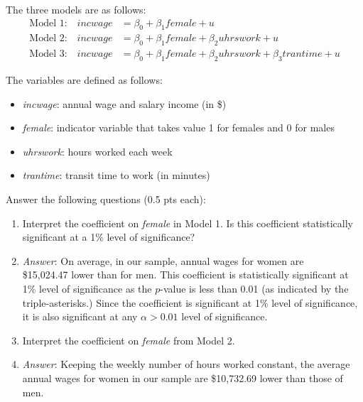 \documentclass{./../../Latex/handout}
\begin{document}
\begin{enumerate}
The three models are as follows: 
\begin{align*}
	 \text{Model 1:} \quad incwage &=\beta_0 + \beta_1  female + u \\
	 \text{Model 2:} \quad incwage &=\beta_0 + \beta_1  female + \beta_2 uhrswork + u \\
	 \text{Model 3:} \quad incwage &=\beta_0 + \beta_1  female + \beta_2 uhrswork + \beta_3 trantime + u 
\end{align*}

The variables are defined as follows:
\begin{itemize}
  \item \textit{incwage}: annual wage and salary income (in \$)
  \item \textit{female}: indicator variable that takes value 1 for females and 0 for males
  \item \textit{uhrswork}: hours worked each week
  \item \textit{trantime}: transit time to work (in minutes) \\
\end{itemize}

Answer the following questions (0.5 pts each):
\begin{enumerate}
  \item Interpret the coefficient on \textit{female} in Model 1. Is this coefficient statistically significant at a 1\% level of significance?
  \item[] \textit{Answer}: On average, in our sample, annual wages for women are \\ \$15,024.47 lower than for men. This coefficient is statistically significant at 1\% level of significance as the $p$-value is less than 0.01 (as indicated by the triple-asterisks.) Since the coefficient is significant at 1\% level of significance, it is also significant at any $\alpha>0.01$ level of significance. \\
  
  \item Interpret the coefficient on \textit{female} from Model 2.
  \item[] \textit{Answer}: Keeping the weekly number of hours worked constant, the average annual wages for women in our sample are \$10,732.69 lower than those of men.	\\
  

\end{enumerate}
\end{enumerate}
\end{document}
